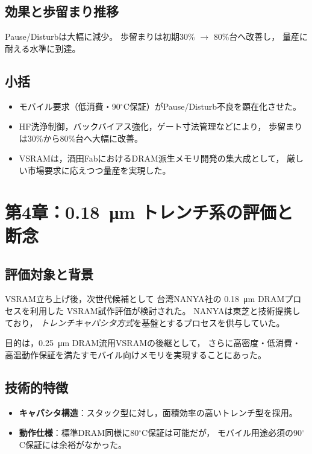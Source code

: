 \documentclass[conference]{IEEEtran}
\let\meter\metre
\begin{document}
\subsection{効果と歩留まり推移}
Pause/Disturbは大幅に減少。
歩留まりは初期30\% $\rightarrow$ 80\%台へ改善し，
量産に耐える水準に到達。

\subsection{小括}
\begin{itemize}
  \item モバイル要求（低消費・90$^\circ$C保証）がPause/Disturb不良を顕在化させた。
  \item HF洗浄制御，バックバイアス強化，ゲート寸法管理などにより，
        歩留まりは30\%から80\%台へ大幅に改善。
  \item VSRAMは，酒田FabにおけるDRAM派生メモリ開発の集大成として，
        厳しい市場要求に応えつつ量産を実現した。
\end{itemize}

\section{第4章：\texorpdfstring{\SI{0.18}{\micro\meter}}{0.18μm} トレンチ系の評価と断念}

\subsection{評価対象と背景}
VSRAM立ち上げ後，次世代候補として
台湾NANYA社の \SI{0.18}{\micro\meter} DRAMプロセスを利用した
VSRAM試作評価が検討された。
NANYAは東芝と技術提携しており，
\emph{トレンチキャパシタ方式}を基盤とするプロセスを供与していた。

目的は，\SI{0.25}{\micro\meter} DRAM流用VSRAMの後継として，
さらに高密度・低消費・高温動作保証を満たすモバイル向けメモリを実現することにあった。

\subsection{技術的特徴}
\begin{itemize}
  \item \textbf{キャパシタ構造}：スタック型に対し，面積効率の高いトレンチ型を採用。
  \item \textbf{動作仕様}：標準DRAM同様に80$^\circ$C保証は可能だが，
        モバイル用途必須の90$^\circ$C保証には余裕がなかった。
\end{itemize}
\end{document}
